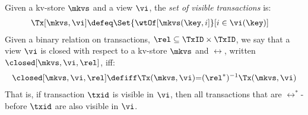 Given a kv-store $\mkvs$ and a view $\vi$, the {\em set of visible
transactions} is: 
{%
\displaymathfont
\begin{align*}
\Tx[\mkvs, \vi] & \defeq
\Set{\wtOf[\mkvs(\key, i] }[ i \in \vi(\key)]
\end{align*}
}%
%
%
%
%
%
Given a binary relation on transactions, $\rel \subseteq \TxID \times \TxID$, we say that a view $\vi$ is closed with respect to a kv-store $\mkvs$ and $\rel$, written $\closed[\mkvs,\vi,\rel]$, iff:  
{%
\displaymathfont
\begin{align*}
	\closed[\mkvs,\vi,\rel]
	\defiff
	\Tx(\mkvs, \vi) {=} 
	(\rel^*)^{-1} \Tx(\mkvs, \vi)
\end{align*}
}%
That is, if transaction $\txid$ is visible in $\vi$, then all transactions that are $\rel^*$-before $\txid$ are also visible in $\vi$.

